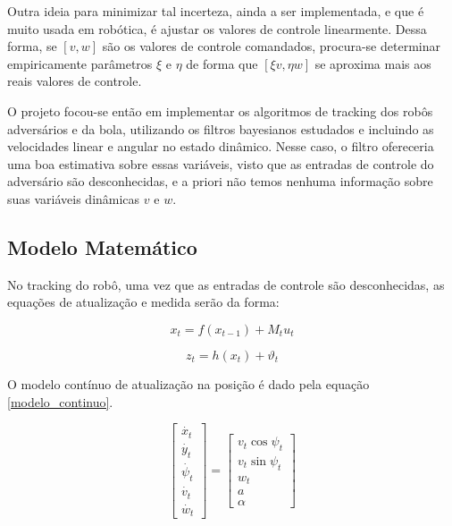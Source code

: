 \documentclass[paper=a4, fontsize=11pt]{scrartcl}
\begin{document}
Outra ideia para minimizar tal incerteza, ainda a ser implementada, e que é muito usada em robótica, é ajustar os valores de controle linearmente. Dessa forma, se $[v,w]$ são os valores de controle comandados, procura-se determinar empiricamente parâmetros $\xi$ e $\eta$ de forma que $[\xi v,\eta w]$ se aproxima mais aos reais valores de controle.

O projeto focou-se então em implementar os algoritmos de tracking dos robôs adversários e da bola, utilizando os filtros bayesianos estudados e incluindo as velocidades linear e angular no estado dinâmico. Nesse caso, o filtro ofereceria uma boa estimativa sobre essas variáveis, visto que as entradas de controle do adversário são desconhecidas, e a priori não temos nenhuma informação sobre suas variáveis dinâmicas $v$ e $w$.



\subsection{Modelo Matemático}

No tracking do robô, uma vez que as entradas de controle são desconhecidas, as equações de atualização e medida serão da forma:

\begin{equation}
\label{tracking_motion}
x_t=f(x_{t-1})+M_t u_t
\end{equation}

\begin{equation}
\label{tracking_measurement}
z_t=h(x_t)+\vartheta_t
\end{equation}

O modelo contínuo de atualização na posição é dado pela equação \ref{modelo_continuo}.

\begin{equation}
    \label{modelo_continuo}
    \begin{bmatrix} \dot{x_t} \\ \dot{y_t} \\ \dot{\psi_t} \\ \dot{v_t} \\ \dot{w_t}
    \end{bmatrix}
    =
    \begin{bmatrix} v_t \cos{\psi_t} \\ v_t \sin{\psi_t} \\ w_t \\ a \\ \alpha
    \end{bmatrix}
\end{equation}
\end{document}
